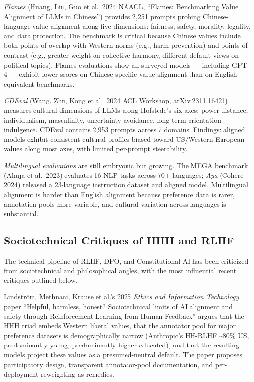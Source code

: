 \emph{Flames} (Huang, Liu, Guo et al.~2024 NAACL, ``Flames: Benchmarking Value Alignment of LLMs in Chinese'') provides 2,251 prompts probing Chinese-language value alignment along five dimensions: fairness, safety, morality, legality, and data protection. The benchmark is critical because Chinese values include both points of overlap with Western norms (e.g., harm prevention) and points of contrast (e.g., greater weight on collective harmony, different default views on political topics). Flames evaluations show all surveyed models --- including GPT-4 --- exhibit lower scores on Chinese-specific value alignment than on English-equivalent benchmarks.

\emph{CDEval} (Wang, Zhu, Kong et al.~2024 ACL Workshop, arXiv:2311.16421) measures cultural dimensions of LLMs along Hofstede's six axes: power distance, individualism, masculinity, uncertainty avoidance, long-term orientation, indulgence. CDEval contains 2,953 prompts across 7 domains. Findings: aligned models exhibit consistent cultural profiles biased toward US/Western European values along most axes, with limited per-prompt steerability.

\emph{Multilingual evaluations} are still embryonic but growing. The MEGA benchmark (Ahuja et al.~2023) evaluates 16 NLP tasks across 70+ languages; \emph{Aya} (Cohere 2024) released a 23-language instruction dataset and aligned model. Multilingual alignment is harder than English alignment because preference data is rarer, annotation pools more variable, and cultural variation across languages is substantial.

\subsection{Sociotechnical Critiques of HHH and RLHF}\label{sociotechnical-critiques-of-hhh-and-rlhf}

The technical pipeline of RLHF, DPO, and Constitutional AI has been criticized from sociotechnical and philosophical angles, with the most influential recent critiques outlined below.

Lindström, Methnani, Krause et al.'s 2025 \emph{Ethics and Information Technology} paper ``Helpful, harmless, honest? Sociotechnical limits of AI alignment and safety through Reinforcement Learning from Human Feedback'' argues that the HHH triad embeds Western liberal values, that the annotator pool for major preference datasets is demographically narrow (Anthropic's HH-RLHF \textasciitilde80\% US, predominantly young, predominantly higher-educated), and that the resulting models project these values as a presumed-neutral default. The paper proposes participatory design, transparent annotator-pool documentation, and per-deployment reweighting as remedies.

